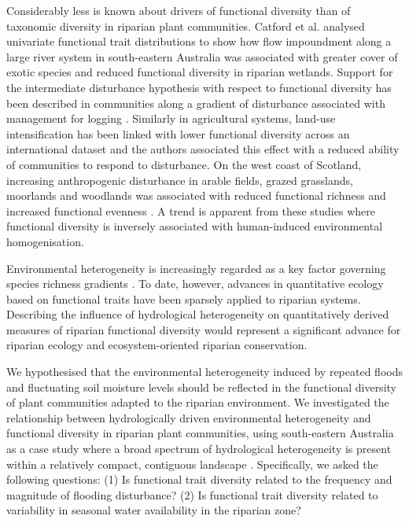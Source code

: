 \documentclass[openright,12pt,a4paper]{memoir}
\begin{document}
Considerably less is known about drivers of functional diversity than of taxonomic diversity in riparian plant communities.  Catford et al. \cite{Catford2011} analysed univariate functional trait distributions to show how flow impoundment along a large river system in south-eastern Australia was associated with greater cover of exotic species and reduced functional diversity in riparian wetlands. Support for the intermediate disturbance hypothesis with respect to functional diversity has been described in communities along a gradient of disturbance associated with management for logging \cite{Biswas2010}. Similarly in agricultural systems, land-use intensification has been linked with lower functional diversity across an international dataset \cite{Laliberte2010} and the authors associated this effect with a reduced ability of communities to respond to disturbance. On the west coast of Scotland, increasing anthropogenic disturbance in arable fields, grazed grasslands, moorlands and woodlands was associated with reduced functional richness and increased functional evenness \cite{Pakeman2011}. A trend is apparent from these studies where functional diversity is inversely associated with human-induced environmental homogenisation.
 
Environmental heterogeneity is increasingly regarded as a key factor governing species richness gradients \cite{Stein2014}. To date, however, advances in quantitative ecology based on functional traits have been sparsely applied to riparian systems. Describing the influence of hydrological heterogeneity on quantitatively derived measures of riparian functional diversity would represent a significant advance for riparian ecology and ecosystem-oriented riparian conservation.

We hypothesised that the environmental heterogeneity induced by repeated floods and fluctuating soil moisture levels should be reflected in the functional diversity of plant communities adapted to the riparian environment. We investigated the relationship between hydrologically driven environmental heterogeneity and functional diversity in riparian plant communities, using south-eastern Australia as a case study where a broad spectrum of hydrological heterogeneity is present within a relatively compact, contiguous landscape \cite{finlayson1988australia, Peel2004}.  Specifically, we asked the following questions: (1) Is functional trait diversity related to the frequency and magnitude of flooding disturbance? (2) Is functional trait diversity related to variability in seasonal water availability in the riparian zone?
\end{document}
